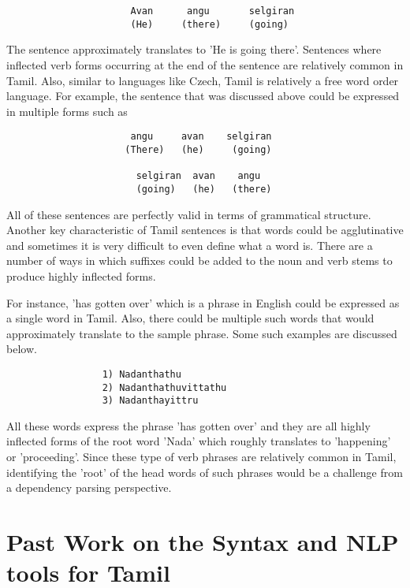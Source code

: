\documentclass[11pt,letterpaper]{article}
\begin{document}
\begin{center}
\begin{verbatim}
                      Avan      angu       selgiran 
                      (He)     (there)     (going)  
\end{verbatim}
\end{center}

The sentence approximately translates to 'He is going there'. Sentences where inflected verb forms
occurring at the end of the sentence are relatively common in Tamil. Also, similar to languages like Czech, 
Tamil is relatively a free word order language. For example, the sentence that was discussed above 
could be expressed in multiple forms such as

\begin{verbatim}
                      angu     avan    selgiran 
                     (There)   (he)     (going)

                       selgiran  avan    angu
                       (going)   (he)   (there)
\end{verbatim}
All of these sentences are perfectly valid in terms of grammatical structure. 
Another key characteristic of Tamil sentences is that words could be agglutinative and sometimes it is very difficult to even define what a word is. 
There are a number of ways in which suffixes could be added to the noun and verb stems to produce highly inflected forms.

For instance, 'has gotten over' which is a phrase in English could be
expressed as a single word in Tamil. Also, there could be multiple such words that would approximately translate to the sample
phrase. Some such examples are discussed below.

\begin{verbatim}
                 1) Nadanthathu
                 2) Nadanthathuvittathu
                 3) Nadanthayittru
\end{verbatim}

All these words express the phrase 'has gotten over' and they are all highly inflected
forms of the root word 'Nada' which roughly translates to 'happening' or 'proceeding'.
Since these type of verb phrases are relatively common in Tamil, identifying the 'root' of the head
words of such phrases would be a challenge from a dependency parsing perspective.

\section{Past Work on the Syntax and NLP tools for Tamil}
\end{document}
